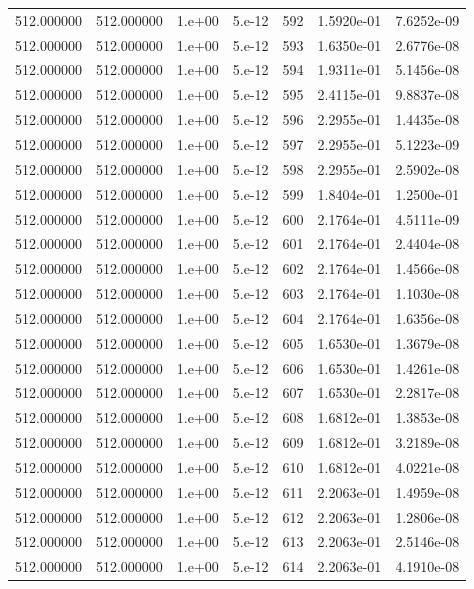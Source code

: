\begin{table}[htbp]
\begin{tabular}{rrrrrrr}
512.000000 & 512.000000 & 1.e+00 & 5.e-12 & 592 & 1.5920e-01 & 7.6252e-09 \\
512.000000 & 512.000000 & 1.e+00 & 5.e-12 & 593 & 1.6350e-01 & 2.6776e-08 \\
512.000000 & 512.000000 & 1.e+00 & 5.e-12 & 594 & 1.9311e-01 & 5.1456e-08 \\
512.000000 & 512.000000 & 1.e+00 & 5.e-12 & 595 & 2.4115e-01 & 9.8837e-08 \\
512.000000 & 512.000000 & 1.e+00 & 5.e-12 & 596 & 2.2955e-01 & 1.4435e-08 \\
512.000000 & 512.000000 & 1.e+00 & 5.e-12 & 597 & 2.2955e-01 & 5.1223e-09 \\
512.000000 & 512.000000 & 1.e+00 & 5.e-12 & 598 & 2.2955e-01 & 2.5902e-08 \\
512.000000 & 512.000000 & 1.e+00 & 5.e-12 & 599 & 1.8404e-01 & 1.2500e-01 \\
512.000000 & 512.000000 & 1.e+00 & 5.e-12 & 600 & 2.1764e-01 & 4.5111e-09 \\
512.000000 & 512.000000 & 1.e+00 & 5.e-12 & 601 & 2.1764e-01 & 2.4404e-08 \\
512.000000 & 512.000000 & 1.e+00 & 5.e-12 & 602 & 2.1764e-01 & 1.4566e-08 \\
512.000000 & 512.000000 & 1.e+00 & 5.e-12 & 603 & 2.1764e-01 & 1.1030e-08 \\
512.000000 & 512.000000 & 1.e+00 & 5.e-12 & 604 & 2.1764e-01 & 1.6356e-08 \\
512.000000 & 512.000000 & 1.e+00 & 5.e-12 & 605 & 1.6530e-01 & 1.3679e-08 \\
512.000000 & 512.000000 & 1.e+00 & 5.e-12 & 606 & 1.6530e-01 & 1.4261e-08 \\
512.000000 & 512.000000 & 1.e+00 & 5.e-12 & 607 & 1.6530e-01 & 2.2817e-08 \\
512.000000 & 512.000000 & 1.e+00 & 5.e-12 & 608 & 1.6812e-01 & 1.3853e-08 \\
512.000000 & 512.000000 & 1.e+00 & 5.e-12 & 609 & 1.6812e-01 & 3.2189e-08 \\
512.000000 & 512.000000 & 1.e+00 & 5.e-12 & 610 & 1.6812e-01 & 4.0221e-08 \\
512.000000 & 512.000000 & 1.e+00 & 5.e-12 & 611 & 2.2063e-01 & 1.4959e-08 \\
512.000000 & 512.000000 & 1.e+00 & 5.e-12 & 612 & 2.2063e-01 & 1.2806e-08 \\
512.000000 & 512.000000 & 1.e+00 & 5.e-12 & 613 & 2.2063e-01 & 2.5146e-08 \\
512.000000 & 512.000000 & 1.e+00 & 5.e-12 & 614 & 2.2063e-01 & 4.1910e-08 \\

\end{tabular}
\end{table}
